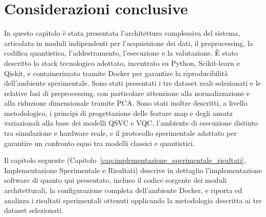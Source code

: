 \section{Considerazioni conclusive}
\label{sec:considerazioni_conclusive_metodologia}

In questo capitolo è stata presentata l'architettura complessiva del sistema, articolata in moduli indipendenti per l'acquisizione dei dati, il preprocessing, la codifica quantistica, l'addestramento, l'esecuzione e la valutazione. È stato descritto lo stack tecnologico adottato, incentrato su Python, Scikit-learn e Qiskit, e containerizzato tramite Docker per garantire la riproducibilità dell'ambiente sperimentale. Sono stati presentati i tre dataset reali selezionati e le relative fasi di preprocessing, con particolare attenzione alla normalizzazione e alla riduzione dimensionale tramite PCA. Sono stati inoltre descritti, a livello metodologico, i principi di progettazione delle feature map e degli ansatz variazionali alla base dei modelli QSVC e VQC, l'ambiente di esecuzione distinto tra simulazione e hardware reale, e il protocollo sperimentale adottato per garantire un confronto equo tra modelli classici e quantistici.

Il capitolo seguente (Capitolo~\ref{cap:implementazione_sperimentale_risultati}, Implementazione Sperimentale e Risultati) descrive in dettaglio l'implementazione software di quanto qui presentato, incluso il codice sorgente dei moduli architetturali, la configurazione completa dell'ambiente Docker, e riporta ed analizza i risultati sperimentali ottenuti applicando la metodologia descritta ai tre dataset selezionati.


